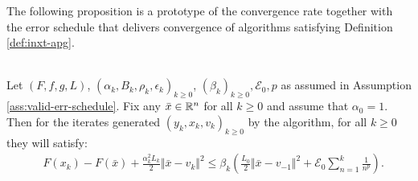 \documentclass[12pt]{article}
\begin{document}
    \par
    The following proposition is a prototype of the convergence rate together with the error schedule that delivers convergence of algorithms satisfying Definition \ref{def:inxt-apg}. 
    \begin{proposition}\;\label{prop:inxt-apg-cnvg-generic}\\
        Let $(F, f, g, L)$, $(\alpha_k, B_k, \rho_k, \epsilon_k)_{k \ge 0}$, $(\beta_k)_{k\ge 0}, \mathcal E_0, p$ as assumed in Assumption \ref{ass:valid-err-schedule}. 
        Fix any $\bar x \in \mathbb R^n$ for all $k \ge 0$ and assume that $\alpha_0 = 1$. 
        Then for the iterates generated $(y_k, x_k, v_k)_{k \ge 0}$ by the algorithm, for all $k \ge 0$ they will satisfy: 
        \begin{align*}
            & F(x_k) - F(\bar x) + \frac{\alpha_k^2L_k}{2}\Vert \bar x - v_k\Vert^2
            \le 
            \beta_k \left(
                \frac{L_0}{2}\Vert \bar x - v_{-1}\Vert^2
                + \mathcal E_0 \sum_{n = 1}^{k} \frac{1}{n^p}
            \right). 
        \end{align*}
    \end{proposition}
\end{document}
